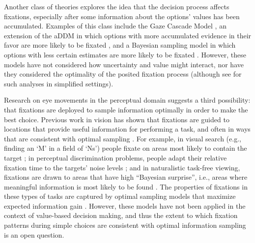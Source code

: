 Another class of theories explores the idea that the decision process affects fixations, especially after some information about the options' values has been accumulated. Examples of this class include the Gaze Cascade Model \citep{shimojo2003gaze}, an extension of the aDDM in which options with more accumulated evidence in their favor are more likely to be fixated \citep{gluth2020valuebased}, and a Bayesian sampling model in which options with less certain estimates are more likely to be fixated \citep{song2019proactive}. However, these models have not considered how uncertainty and value might interact, nor have they considered the optimality of the posited fixation process (although see \citep{sepulveda2020visual,moreno-bote2020heuristics,ramirez-ruiz2021optimal} for such analyses in simplified settings).

Research on eye movements in the perceptual domain suggests a third possibility: that fixations are deployed to sample information optimally in order to make the best choice. Previous work in vision has shown that fixations are guided to locations that provide useful information for performing a task, and often in ways that are consistent with optimal sampling \citep{gottlieb2018neuroscience}. For example, in visual search (e.g., finding an `M' in a field of `Ns') people fixate on areas most likely to contain the target \citep{najemnik2005optimal,eckstein2011visual}; in perceptual discrimination problems, people adapt their relative fixation time to the targets' noise levels \citep{cassey2013adaptive,ludwig2017information}; and in naturalistic task-free viewing, fixations are drawn to areas that have high ``Bayesian surprise'', i.e., areas where meaningful information is most likely to be found \citep{itti2009bayesian}. The properties of fixations in these types of tasks are captured by optimal sampling models that maximize expected information gain \citep{gottlieb2013informationseeking,gottlieb2018neuroscience}.
However, these models have not been applied in the context of value-based decision making, and thus the extent to which fixation patterns during simple choices are consistent with optimal information sampling is an open question.


